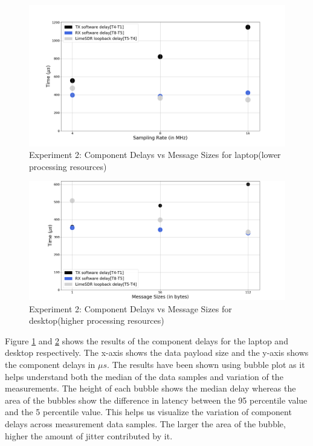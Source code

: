 \begin{figure}[h!]
\centering
\includegraphics[width=\textwidth]{Thesis/Figure/E2_M1.png}
\caption{Experiment 2: Component Delays vs Message Sizes for laptop(lower processing resources)}
\label{e2_m1}
\end{figure}

\begin{figure}[h!]
\centering
\includegraphics[width=\textwidth]{Thesis/Figure/E2_M2_1.png}
\caption{Experiment 2: Component Delays vs Message Sizes for desktop(higher processing resources)}
\label{e2_m2}
\end{figure}


Figure \ref{e2_m1} and \ref{e2_m2} shows the results of the component delays  for the laptop and desktop respectively.
The x-axis shows the data payload size and the y-axis shows the component delays in $\mu s$.
The results have been shown using bubble plot as it helps understand both the median of the data samples and variation of the measurements.
The height of each bubble shows the median delay whereas the area of the bubbles show the difference in latency between the 95 percentile value and the 5 percentile value.
This helps us visualize the variation of component delays across measurement data samples.
The larger the area of the bubble, higher the amount of jitter contributed by it.\\

